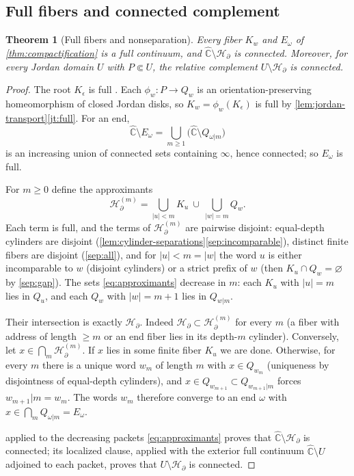 \documentclass[11pt,reqno]{amsart}
\numberwithin{equation}{section}
\theoremstyle{plain}
\newtheorem{theorem}{Theorem}[section]
\theoremstyle{definition}
\theoremstyle{remark}
\newcommand{\Chat}{\widehat{\mathbb C}}
\newcommand{\HB}{\mathcal H_\partial}
\newcommand{\rootK}{K_{\epsilon}}
\begin{document}
\subsection{Full fibers and connected complement}

\begin{theorem}[Full fibers and nonseparation]
\label{thm:full-nonseparating}
Every fiber $K_w$ and $E_\omega$ of \cref{thm:compactification} is a
full continuum, and $\Chat\setminus\HB$ is connected.  Moreover, for
every Jordan domain $U$ with $P\Subset U$, the relative complement
$U\setminus\HB$ is connected.
\end{theorem}

\begin{proof}
The root $\rootK$ is full \cite{DH85}.  Each
$\phi_w\colon P\to Q_w$ is an orientation-preserving homeomorphism of
closed Jordan disks, so $K_w=\phi_w(\rootK)$ is full by
\cref{lem:jordan-transport}\ref{jt:full}.  For an end,
\[
 \Chat\setminus E_\omega
 =
 \bigcup_{m\ge1}
 \bigl(\Chat\setminus Q_{\omega|m}\bigr)
\]
is an increasing union of connected sets containing $\infty$, hence
connected; so $E_\omega$ is full.

For $m\ge0$ define the approximants
\begin{equation}
 \HB^{(m)}
 =
 \bigcup_{|u|<m}K_u
 \ \cup\
 \bigcup_{|w|=m}Q_w .
\label{eq:approximants}
\end{equation}
Each term is full, and the terms of $\HB^{(m)}$ are pairwise disjoint:
equal-depth cylinders are disjoint
(\cref{lem:cylinder-separations}\ref{sep:incomparable}), distinct finite
fibers are disjoint (\ref{sep:all}), and for $|u|<m=|w|$ the word $u$ is
either incomparable to $w$ (disjoint cylinders) or a strict prefix of
$w$ (then $K_u\cap Q_w=\varnothing$ by \ref{sep:gap}).  The sets
\eqref{eq:approximants} decrease in $m$: each $K_u$ with $|u|=m$ lies in
$Q_u$, and each $Q_w$ with $|w|=m+1$ lies in $Q_{w|m}$.

Their intersection is exactly $\HB$.  Indeed $\HB\subset\HB^{(m)}$ for
every $m$ (a fiber with address of length $\ge m$ or an end fiber lies
in its depth-$m$ cylinder).  Conversely, let
$x\in\bigcap_m\HB^{(m)}$.  If $x$ lies in some finite fiber $K_u$ we are
done.  Otherwise, for every $m$ there is a unique word $w_m$ of length
$m$ with $x\in Q_{w_m}$ (uniqueness by disjointness of equal-depth
cylinders), and $x\in Q_{w_{m+1}}\subset Q_{w_{m+1}|m}$ forces
$w_{m+1}|m=w_m$.  The words $w_m$ therefore converge to an end $\omega$
with $x\in\bigcap_mQ_{\omega|m}=E_\omega$.

 applied to the decreasing packets
\eqref{eq:approximants} proves that $\Chat\setminus\HB$ is connected;
its localized clause, applied with the exterior full continuum
$\Chat\setminus U$ adjoined to each packet, proves that
$U\setminus\HB$ is connected.
\end{proof}
\end{document}
